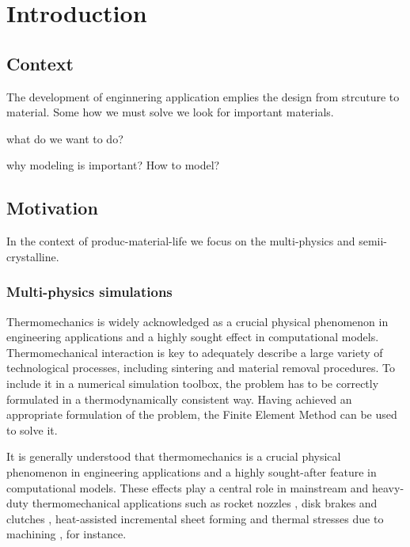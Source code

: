 \chapter{Introduction}

\section{Context}

The development of enginnering application emplies the design
from strcuture to material.
Some how we must solve
we look for important materials.

what do we want to do?

why modeling is important?
How to model?

\section{Motivation}

In the context of produc-material-life we focus on the multi-physics and semii-crystalline.

\subsection{Multi-physics simulations}

Thermomechanics is widely acknowledged as a crucial physical phenomenon in engineering applications and a highly sought effect in computational models.
Thermomechanical interaction is key to adequately describe a large variety of technological processes, including sintering and material removal procedures.
To include it in a numerical simulation toolbox, the problem has to be correctly formulated in a thermodynamically consistent way.
Having achieved an appropriate formulation of the problem, the Finite Element Method can be used to solve it.

It is generally understood that thermomechanics is a crucial physical phenomenon in engineering applications and a highly sought-after feature in computational models.
These effects play a central role in mainstream and heavy-duty thermomechanical applications such as rocket nozzles \citep{kuhl2002ThermomechanicalAnalysisOptimization,danowski_monolithic_2013}, disk brakes and clutches \citep{yevtushenko2015NumericalAnalysisThermal}, heat-assisted incremental sheet forming \citep{liu2018HeatassistedIncrementalSheet} and thermal stresses due to machining \citep{elsheikh2021ComprehensiveReviewResidual}, for instance.

